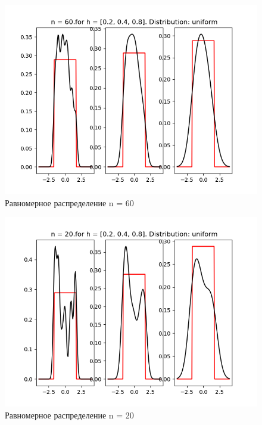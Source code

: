 \documentclass[a4]{article}
\begin{document}
\begin{center}
\begin{figure}[h!]
				\includegraphics[width=\textwidth]{uniformker60.png}
				\caption[Равномерное распределение n = 60]{Равномерное распределение n = 60}
			\end{figure}
			\newpage
			\begin{figure}[h!]
				\includegraphics[width=\textwidth]{uniformker20.png}
				\caption[Равномерное распределение n = 20]{Равномерное распределение n = 20}
			\end{figure}
			\newpage
			\begin{figure}[h!]

\end{figure}
\end{center}
\end{document}

